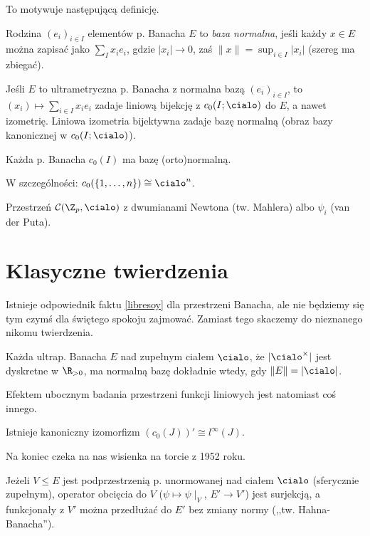 To motywuje następującą definicję.

\begin{definicja}
	Rodzina $(e_i)_{i \in I}$ elementów p. Banacha $E$ to \emph{baza normalna}, jeśli każdy $x \in E$ można zapisać jako $\sum_I x_i e_i$, gdzie $|x_i| \to 0$, zaś $\|x\| = \sup_{i \in I} |x_i|$ (szereg ma zbiegać).
\end{definicja}

\begin{fakt}
	Jeśli $E$ to ultrametryczna p. Banacha z normalna bazą $(e_i)_{i \in I}$, to $(x_i) \mapsto \sum_{i \in I} x_i e_i$ zadaje liniową bijekcję z $c_0(I; \cialo)$ do $E$, a nawet izometrię.
	Liniowa izometria bijektywna zadaje bazę normalną (obraz bazy kanonicznej w $c_0(I; \cialo)$).
\end{fakt}

\begin{przyklad}
	Każda p. Banacha $c_0(I)$ ma bazę (orto)normalną.
\end{przyklad}

\begin{przyklad}
	W szczególności: $c_0(\{1, \ldots, n\}) \cong \cialo^n$.
\end{przyklad}

\begin{przyklad}
	Przestrzeń $\mathcal C(\Z_p, \cialo)$ z dwumianami Newtona (tw. Mahlera) albo $\psi_i$ (van der Puta).
\end{przyklad}

\section{Klasyczne twierdzenia}

Istnieje odpowiednik faktu \ref{libresoy} dla przestrzeni Banacha, ale nie będziemy się tym czymś dla świętego spokoju zajmować.
Zamiast tego skaczemy do nieznanego nikomu twierdzenia.

\begin{twierdzenie}
	Każda  ultrap. Banacha $E$ nad zupełnym ciałem $\cialo$, że $|\cialo^\times|$ jest dyskretne w $\R_{> 0}$, ma normalną bazę dokładnie wtedy, gdy $\|E\| = |\cialo|$.
\end{twierdzenie}

Efektem ubocznym badania przestrzeni funkcji liniowych jest natomiast coś innego.

\begin{wniosek}
	Istnieje  kanoniczny izomorfizm $(c_0(J))' \cong l^\infty(J)$.
\end{wniosek}

Na koniec czeka na nas wisienka na torcie z 1952 roku.

\begin{twierdzenie}[Ingleton]
	Jeżeli  $V \le E$ jest podprzestrzenią p. unormowanej nad ciałem $\cialo$ (sferycznie zupełnym), operator obcięcia do $V$ ($\psi \mapsto \psi \mid_V$, $E' \to V'$) jest surjekcją, a funkcjonały z $V'$ można przedłużać do $E'$ bez zmiany normy (,,tw. Hahna-Banacha'').
\end{twierdzenie}